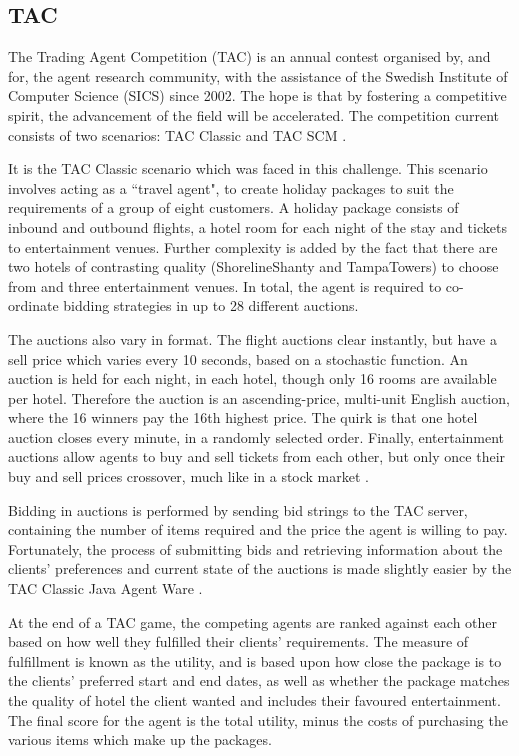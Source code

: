 \documentclass{acm_proc_article-sp}
\begin{document}
 \subsection{TAC}
 The Trading Agent Competition (TAC) is an annual contest organised by, and for, the agent research community, with the assistance of the Swedish Institute of Computer Science (SICS) since 2002.  The hope is that by fostering a competitive spirit, the advancement of the field will be accelerated.  The competition current consists of two scenarios: TAC Classic and TAC SCM \cite{SICS2007c}.
 
 It is the TAC Classic scenario which was faced in this challenge.  This scenario involves acting as a ``travel agent", to create holiday packages to suit the requirements of a group of eight customers.  A holiday package consists of inbound and outbound flights, a hotel room for each night of the stay and tickets to entertainment venues.  Further complexity is added by the fact that there are two hotels of contrasting quality (ShorelineShanty and TampaTowers) to choose from and three entertainment venues.  In total, the agent is required to co-ordinate bidding strategies in up to 28 different auctions.
 
 The auctions also vary in format.  The flight auctions clear instantly, but have a sell price which varies every 10 seconds, based on a stochastic function.  An auction is held for each night, in each hotel, though only 16 rooms are available per hotel.  Therefore the auction is an ascending-price, multi-unit English auction, where the 16 winners pay the 16th highest price.  The quirk is that one hotel auction closes every minute, in a randomly selected order.  Finally, entertainment auctions allow agents to buy and sell tickets from each other, but only once their buy and sell prices crossover, much like in a stock market \cite{SICS2007b}.
 
 Bidding in auctions is performed by sending bid strings to the TAC server, containing the number of items required and the price the agent is willing to pay.  Fortunately, the process of submitting bids and retrieving information about the clients' preferences and current state of the auctions is made slightly easier by the TAC Classic Java Agent Ware \cite{SICS2007a}.
 
 At the end of a TAC game, the competing agents are ranked against each other based on how well they fulfilled their clients' requirements.  The measure of fulfillment is known as the utility, and is based upon how close the package is to the clients' preferred start and end dates, as well as whether the package matches the quality of hotel the client wanted and includes their favoured entertainment.  The final score for the agent is the total utility, minus the costs of purchasing the various items which make up the packages.
 
\end{document}
